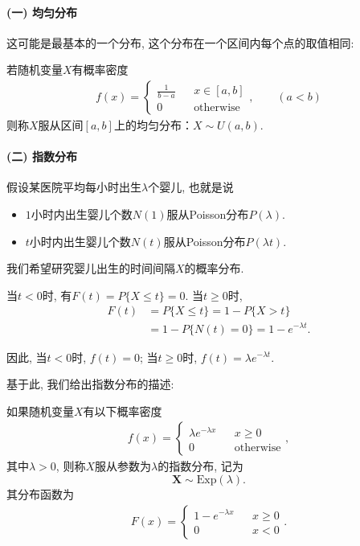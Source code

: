 \paragraph{(一) 均匀分布}

这可能是最基本的一个分布, 这个分布在一个区间内每个点的取值相同:

\begin{definition}
    若随机变量$X$有概率密度
    \begin{align*}
        f(x)=\left\{\begin{array}{lcl}
                        \frac1{b-a} &  & x\in [a,b]       \\
                        0           &  & \mbox{otherwise}
                    \end{array}\right. ,\qquad (a<b)
    \end{align*}
    则称$X$服从区间$[a,b]$上的均匀分布：$X\sim U(a,b)$.
\end{definition}%


\paragraph{(二) 指数分布}

假设某医院平均每小时出生$\lambda$个婴儿, 也就是说
\begin{itemize}
    \item $1$小时内出生婴儿个数$N(1)$服从Poisson分布$P(\lambda)$. 
    \item $t$小时内出生婴儿个数$N(t)$服从Poisson分布$P(\lambda t)$. 
\end{itemize}
我们希望研究婴儿出生的时间间隔$X$的概率分布. 


当$t<0$时, 有$F(t)=P\{X\le t\}=0$.  当$t\ge0$时, 
\begin{align*}
    F(t) & =P\{X\le t\}=1-P\{X>t\}          \\
         & =1-P\{N(t)=0\}=1-e^{-\lambda t}.
\end{align*}

因此, 当$t<0$时, $f(t)=0$;  当$t\ge0$时, $f(t)=\lambda e^{-\lambda t}$. 

基于此, 我们给出指数分布的描述:
\begin{definition}
    如果随机变量$X$有以下概率密度
    \begin{align*}
        f(x)=\left\{\begin{array}{lcl}
                        \lambda e^{-\lambda x} &  & x\ge 0           \\
                        0                      &  & \mbox{otherwise}
                    \end{array}\right. ,
    \end{align*}
    其中$\lambda>0$, 则称$X$服从参数为$\lambda$的指数分布, 记为
    \[\pmb X\sim \text{Exp}(\lambda). \]
    其分布函数为
    \begin{align*}
        F(x)=\left\{\begin{array}{lcl}
                        1- e^{-\lambda x} &  & x\ge 0 \\
                        0                 &  & x<0
                    \end{array}\right. .
    \end{align*}
\end{definition}

